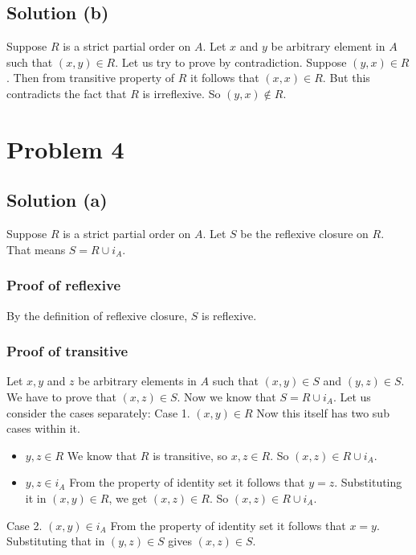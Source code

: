 \documentclass{article}
\begin{document}
\subsection{Solution (b)}
Suppose $R$ is a strict partial order on $A$. Let $x$ and $y$ be
arbitrary element in $A$ such that $(x,y) \in R$. Let us try to prove
by contradiction. Suppose $(y,x) \in R$. Then from transitive property
of $R$ it follows that $(x,x) \in R$. But this contradicts the fact
that $R$ is irreflexive. So $(y,x) \notin R$.

\section{Problem 4}
\subsection{Solution (a)}
Suppose $R$ is a strict partial order on $A$. Let $S$ be the reflexive
closure on $R$. That means $S = R \cup i_A$.
\subsubsection{Proof of reflexive}
By the definition of reflexive closure, $S$ is reflexive.

\subsubsection{Proof of transitive}
Let $x,y$ and $z$ be arbitrary elements in $A$ such that $(x,y) \in S$
and $(y,z) \in S$. We have to prove that $(x,z) \in S$. Now we know
that $S = R \cup i_A$. Let us consider the cases separately:
Case 1. $(x,y) \in R$ Now this itself has two sub cases within it.
\begin{itemize}
\item $y,z \in R$ We know that $R$ is transitive, so $x,z \in R$.
  So $(x,z) \in R \cup i_A$.
\item $y,z \in i_A$ From the property of identity set it follows that
  $y = z$. Substituting it in $(x,y) \in R$, we get $(x,z) \in R$. So
  $(x,z) \in R \cup i_A$.
\end{itemize}
Case 2. $(x,y) \in i_A$ From the property of identity set it follows
that $x = y$. Substituting that in $(y,z) \in S$ gives $(x,z) \in S$.
\end{document}
